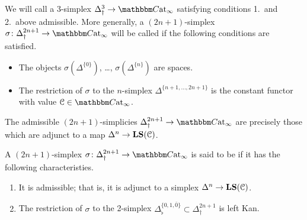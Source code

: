 \documentclass[main.tex]{subfiles}
\begin{document}
\begin{definition}
  \label{def:admissible}
  We will call a 3-simplex $\Delta^{3}_{\dagger} \to \ICCat$ satisfying conditions 1.\ and 2.\ above admissible. More generally, a $(2n+1)$-simplex $\sigma\colon \Delta^{2n+1}_{\dagger} \to \ICCat$ will be called  if the following conditions are satisfied.
  \begin{itemize}
    \item The objects $\sigma(\Delta^{\{0\}})$, \dots, $\sigma(\Delta^{\{n\}})$ are spaces.

    \item The restriction of $\sigma$ to the $n$-simplex $\Delta^{\{n+1, \ldots, 2n+1\}}$ is the constant functor with value $\category{C} \in \ICCat$.
  \end{itemize}
\end{definition}

\begin{note}
  The admissible $(2n+1)$-simplicies $\Delta^{2n+1}_{\dagger} \to \ICCat$ are precisely those which are adjunct to a map $\Delta^{n} \to \mathbf{LS}(\mathcal{C})$.
\end{note}

\begin{definition}
  \label{def:left_kan_simplex}
  A $(2n+1)$-simplex $\sigma\colon \Delta^{2n+1}_{\dagger} \to \ICCat$ is said to be  if it has the following characteristies.
  \begin{enumerate}
    \item It is admissible; that is, it is adjunct to a simplex $\Delta^{n} \to \mathbf{LS}(\mathcal{C})$.

    \item The restriction of $\sigma$ to the 2-simplex $\Delta^{\{0,1,\overline{0}\}}_{\flat} \subset \Delta^{2n+1}_{\dagger}$ is left Kan.
  \end{enumerate}
\end{definition}
\end{document}
